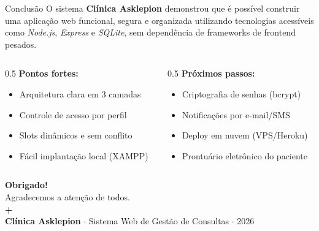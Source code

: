 \documentclass[xcolor={table}]{beamer}
\begin{document}
\begin{frame}{Conclusão}
    \justifying
    O sistema \textbf{Clínica Asklepion} demonstrou que é possível construir uma aplicação web funcional, segura e organizada utilizando tecnologias acessíveis como \textit{Node.js}, \textit{Express} e \textit{SQLite}, sem dependência de frameworks de frontend pesados.

    \vspace{0.4cm}
    \begin{columns}
        \begin{column}{0.5\textwidth}
            \textbf{Pontos fortes:}
            \begin{itemize}
                \item Arquitetura clara em 3 camadas
                \item Controle de acesso por perfil
                \item Slots dinâmicos e sem conflito
                \item Fácil implantação local (XAMPP)
            \end{itemize}
        \end{column}
        \begin{column}{0.5\textwidth}
            \textbf{Próximos passos:}
            \begin{itemize}
                \item Criptografia de senhas (bcrypt)
                \item Notificações por e-mail/SMS
                \item Deploy em nuvem (VPS/Heroku)
                \item Prontuário eletrônico do paciente
            \end{itemize}
        \end{column}
    \end{columns}
\end{frame}

\begin{frame}[plain]
    \centering
    \vspace{1.2cm}
    {\huge \color{ClinicBlue} \textbf{Obrigado!}}\\
    \vspace{0.8cm}
    \large Agradecemos a atenção de todos.\\
    \vspace{1cm}
    {\color{ClinicBlue}\Huge\textbf{+}}\\
    \vspace{0.4cm}
    \footnotesize \textbf{Clínica Asklepion} $\cdot$ Sistema Web de Gestão de Consultas $\cdot$ 2026
\end{frame}
\end{document}
